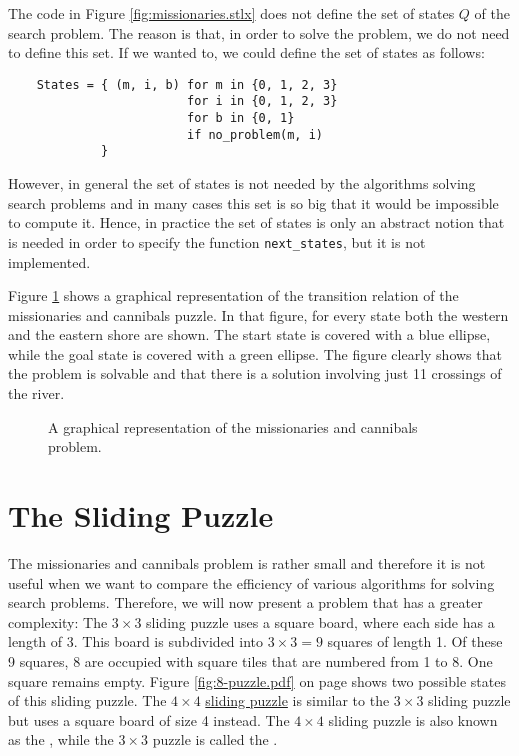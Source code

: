 The code in Figure \ref{fig:missionaries.stlx} does not define the set of states $Q$ of the search problem.  The
reason is that, in order to solve the problem, we do not need to define this set.  If we wanted to, we could
define the set of states as follows: 
\begin{verbatim}
    States = { (m, i, b) for m in {0, 1, 2, 3}
                         for i in {0, 1, 2, 3}
                         for b in {0, 1} 
                         if no_problem(m, i)
             }
\end{verbatim}
However, in general the set of states is not needed by the algorithms solving search problems and in many cases
this set is so big that it would be impossible to compute it.  Hence, in practice the set of states is only an
abstract notion that is needed in order to specify the function \texttt{next\_states}, but it is not implemented.

Figure \ref{fig:missionaries.pdf} shows a graphical representation of the transition relation of the
missionaries and cannibals puzzle.  In that figure, for every state both the western and the
eastern shore are shown.  The start state is covered with a blue ellipse, while the goal state is
covered with a green ellipse.  The figure clearly shows that the problem is solvable and that there
is a solution involving just 11 crossings of the river.
\eox

\begin{figure}[!ht]
  \centering
  \caption{A graphical representation of the missionaries and cannibals problem.}
  \label{fig:missionaries.pdf}
\end{figure}


\section{The Sliding Puzzle}
The missionaries and cannibals problem is rather small and therefore it is not useful when we want to compare
the efficiency of various algorithms for solving search problems.  Therefore, we will now present a problem
that has a greater complexity:  The $3 \times 3$ sliding puzzle uses a 
square board, where each side has a length of 3.  This board is subdivided into $3 \times 3 = 9$ squares of length 1.  Of
these 9 squares, 8 are occupied with square tiles that are numbered from 1 to 8.  One square remains
empty. Figure \ref{fig:8-puzzle.pdf} on page \pageref{fig:8-puzzle.pdf} shows two possible states of this
sliding puzzle.  The $4 \times 4$ \href{https://en.wikipedia.org/wiki/15_puzzle}{sliding puzzle}
is similar to the $3 \times 3$ sliding puzzle but uses a square board of size 4
instead.  The $4 \times 4$ sliding puzzle is also known as the , while the $3 \times 3$ puzzle is
called the .  

